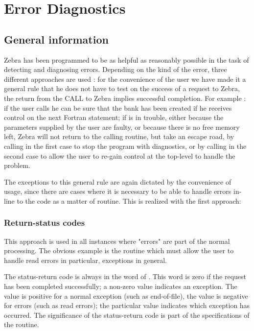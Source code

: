 \chapter{Error Diagnostics}

\section{General information}

Zebra has been programmed to be as helpful as reasonably
possible in the task of detecting and diagnosing errors.
Depending on the kind of the error,
three different approaches are used :
for the convenience of the user we have made it a general rule
that he does not have to test on the success of a request to Zebra,
the return from the CALL to Zebra implies successful completion.
For example : if the user calls  he can be sure that
the bank has been created if he receives control on the next
Fortran statement;
if  is in trouble, either because the parameters supplied
by the user are faulty,
or because there is no free memory left,
Zebra will not return to the calling routine,
but take an escape road,
by calling  in the first case to stop the program with
diagnostics,
or by calling  in the second case to allow the user
to re-gain control at the top-level to handle the problem.

The exceptions to this general rule are again dictated by the
convenience of usage,
since there are cases where it is necessary to be able to
handle errors in-line to the code as a matter of routine.
This is realized with the first approach:

\subsection*{Return-status codes}

This approach is used in all instances where "errors" are part of
the normal processing.
The obvious example is the routine  which must allow the
user to handle read errors in particular, exceptions in general.

The status-return code
is always in the word  of .
This word is zero if the request has been completed successfully;
a non-zero value indicates an exception.
The value is positive for a normal exception (such as end-of-file),
the value is negative for errors (such as read errors);
the particular value indicates which exception has occurred.
The significance of the status-return code is part of the
specifications of the routine.

